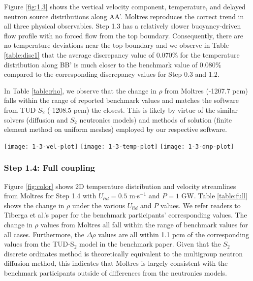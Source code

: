 Figure \ref{fig:1.3} shows the vertical velocity component, temperature, and
delayed neutron source distributions along AA'.
Moltres reproduces the correct trend in all three physical
observables. Step 1.3 has a relatively slower buoyancy-driven flow profile with
no forced flow from the top boundary. Consequently, there are no temperature
deviations near the top boundary and we observe in Table \ref{table:disc1} that
the average discrepancy value of 0.070\% for the temperature distribution along
BB' is much closer to the benchmark value of 0.080\% compared to the
corresponding discrepancy values for Step 0.3 and 1.2.

In Table \ref{table:rho}, we observe that the change in $\rho$ from
Moltres (-1207.7 pcm) falls within the range of reported benchmark values and
matches the software from TUD-$S_2$ (-1208.5 pcm) the closest. This is likely
by virtue of the similar solvers (diffusion and $S_2$ neutronics models) and
methods of solution (finite element method on uniform meshes) employed by our
respective software.
%
\begin{figure*}[htb]
	\centering
	\texttt{[image: 1-3-vel-plot]}
	\texttt{[image: 1-3-temp-plot]}
	\texttt{[image: 1-3-dnp-plot]}
	\caption{Step 1.3 \textemdash\ Vertical velocity component, temperature distribution,
	and delayed neutron source along AA'.}
	\label{fig:1.3}
\end{figure*}

\FloatBarrier

\subsubsection{Step 1.4: Full coupling}

Figure \ref{fig:color} shows 2D temperature distribution and velocity
streamlines from Moltres for Step 1.4 with $U_{lid} = 0.5$ m$\cdot$s$^{-1}$ and
$P = 1$ GW. Table \ref{table:full} shows the change in $\rho$ under the various
$U_{lid}$ and $P$ values. We refer readers to Tiberga et al.'s paper
\cite{tiberga_results_2020} for the benchmark participants' corresponding
values. The change in $\rho$ values from Moltres all fall within the range of
benchmark values
for all cases. Furthermore, the $\Delta\rho$ values are all within 1.1 pcm of
the corresponding values from the TUD-S$_2$ model in the benchmark paper. Given
that the $S_2$ discrete ordinates method is theoretically equivalent to the
multigroup neutron diffusion method, this indicates that Moltres is largely
consistent with the benchmark participants outside of differences from the
neutronics models.

